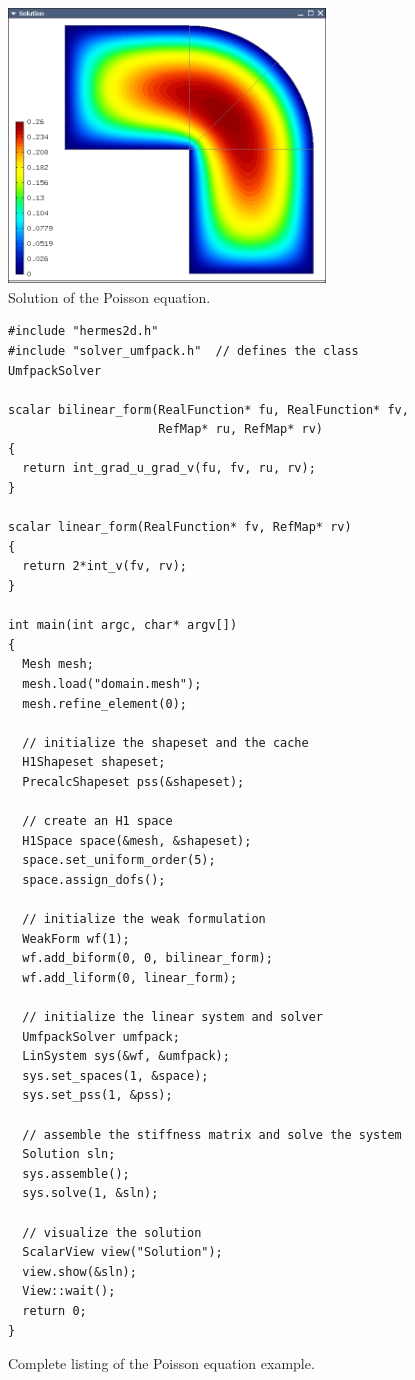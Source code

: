 \begin{figure}[ht]
  \centering\medskip
  \includegraphics[width=0.75\textwidth]{img/poisson.png}
  \caption{Solution of the Poisson equation.}
  \label{fig:poisson}
\end{figure}



\begin{figure}[p]
\begin{lstlisting}
#include "hermes2d.h"
#include "solver_umfpack.h"  // defines the class UmfpackSolver

scalar bilinear_form(RealFunction* fu, RealFunction* fv,
                     RefMap* ru, RefMap* rv)
{
  return int_grad_u_grad_v(fu, fv, ru, rv);
}

scalar linear_form(RealFunction* fv, RefMap* rv)
{
  return 2*int_v(fv, rv);
}

int main(int argc, char* argv[])
{
  Mesh mesh;
  mesh.load("domain.mesh");
  mesh.refine_element(0);

  // initialize the shapeset and the cache
  H1Shapeset shapeset;
  PrecalcShapeset pss(&shapeset);
  
  // create an H1 space
  H1Space space(&mesh, &shapeset);
  space.set_uniform_order(5);
  space.assign_dofs();

  // initialize the weak formulation
  WeakForm wf(1);
  wf.add_biform(0, 0, bilinear_form);
  wf.add_liform(0, linear_form);

  // initialize the linear system and solver
  UmfpackSolver umfpack;
  LinSystem sys(&wf, &umfpack);
  sys.set_spaces(1, &space);
  sys.set_pss(1, &pss);
  
  // assemble the stiffness matrix and solve the system
  Solution sln;
  sys.assemble();
  sys.solve(1, &sln);

  // visualize the solution
  ScalarView view("Solution");
  view.show(&sln);
  View::wait();
  return 0;
}
\end{lstlisting}
  \vspace{-2mm}
  \caption{Complete listing of the Poisson equation example.}
  \label{fig:poissoncomplete}
\end{figure}


